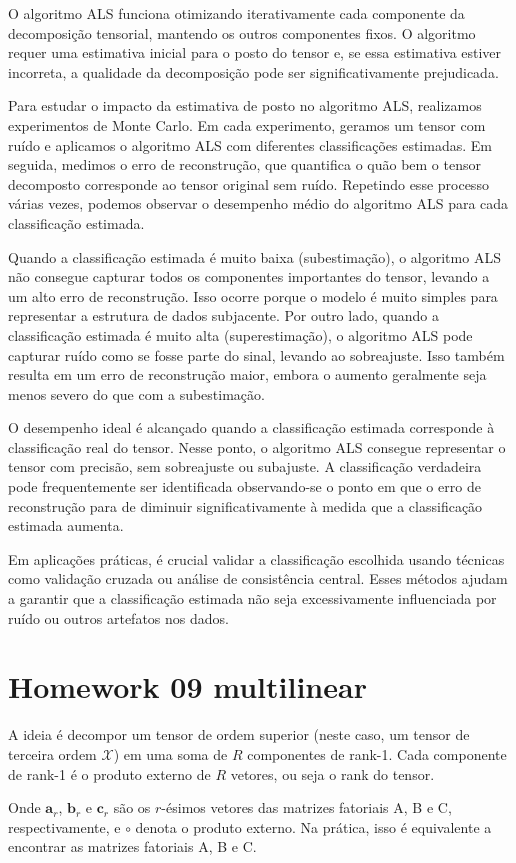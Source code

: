 O algoritmo ALS funciona otimizando iterativamente cada componente da decomposição tensorial, mantendo os outros componentes fixos. O algoritmo requer uma estimativa inicial para o posto do tensor e, se essa estimativa estiver incorreta, a qualidade da decomposição pode ser significativamente prejudicada.

Para estudar o impacto da estimativa de posto no algoritmo ALS, realizamos experimentos de Monte Carlo. Em cada experimento, geramos um tensor com ruído e aplicamos o algoritmo ALS com diferentes classificações estimadas. Em seguida, medimos o erro de reconstrução, que quantifica o quão bem o tensor decomposto corresponde ao tensor original sem ruído. Repetindo esse processo várias vezes, podemos observar o desempenho médio do algoritmo ALS para cada classificação estimada.

Quando a classificação estimada é muito baixa (subestimação), o algoritmo ALS não consegue capturar todos os componentes importantes do tensor, levando a um alto erro de reconstrução. Isso ocorre porque o modelo é muito simples para representar a estrutura de dados subjacente. Por outro lado, quando a classificação estimada é muito alta (superestimação), o algoritmo ALS pode capturar ruído como se fosse parte do sinal, levando ao sobreajuste. Isso também resulta em um erro de reconstrução maior, embora o aumento geralmente seja menos severo do que com a subestimação.

O desempenho ideal é alcançado quando a classificação estimada corresponde à classificação real do tensor. Nesse ponto, o algoritmo ALS consegue representar o tensor com precisão, sem sobreajuste ou subajuste. A classificação verdadeira pode frequentemente ser identificada observando-se o ponto em que o erro de reconstrução para de diminuir significativamente à medida que a classificação estimada aumenta.

Em aplicações práticas, é crucial validar a classificação escolhida usando técnicas como validação cruzada ou análise de consistência central. Esses métodos ajudam a garantir que a classificação estimada não seja excessivamente influenciada por ruído ou outros artefatos nos dados.

\section{Homework 09 multilinear}

A ideia é decompor um tensor de ordem superior (neste caso, um tensor de terceira ordem $\mathcal{X}$) em uma soma de $R$ componentes de rank-1. Cada componente de rank-1 é o produto externo de $R$ vetores, ou seja o rank do tensor.

Onde $\mathbf{a}_r$, $\mathbf{b}_r$ e $\mathbf{c}_r$ são os $r$-ésimos vetores das matrizes fatoriais A, B e C, respectivamente, e $\circ$ denota o produto externo. Na prática, isso é equivalente a encontrar as matrizes fatoriais A, B e C.


